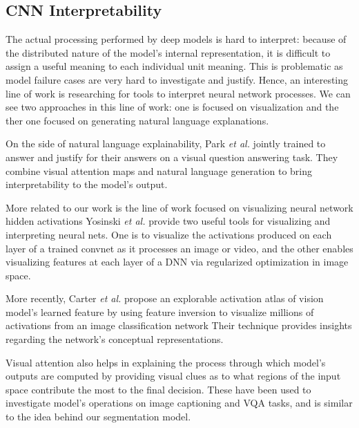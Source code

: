\documentclass[10pt,twocolumn,letterpaper]{article}
\begin{document}
\subsection{CNN Interpretability}
The actual processing performed by deep models is hard to interpret:
because of the distributed nature of the model's internal representation,
it is difficult to assign a useful meaning to each individual unit meaning.
This is problematic as model failure cases are very hard to investigate and justify.
Hence, an interesting line of work is researching for tools to interpret neural network processes.
We can see two approaches in this line of work:
one is focused on visualization and the ther one focused on generating natural language explanations.
 
On the side of natural language explainability, Park \textit{et al.} \cite{park2016attentive} jointly trained to answer and justify for their
answers on a visual question answering task. 
They combine visual attention maps and natural language generation to bring interpretability to the model's output.
 
More related to our work is the line of work focused on visualizing neural network hidden activations
Yosinski \textit{et al.} \cite{yosinski2015understanding} provide two useful tools for visualizing and interpreting neural nets. 
One is to visualize  the activations produced on each layer of a trained convnet as it 
processes an image or video, and the other enables visualizing 
features at each layer of a DNN via regularized optimization in image space.

More recently, Carter \textit{et al.} \cite{carter2019activation} propose an explorable activation atlas of vision model's learned feature by using feature inversion to visualize millions of activations from an image classification network
Their technique provides insights regarding the network's conceptual representations.

Visual attention \cite{allport1989visual} also helps in explaining the process through which model's 
outputs are computed by providing visual clues as to what regions of the input space 
contribute the most to the final decision. 
These have been used to investigate model's operations on image captioning \cite{you2016image} and VQA \cite{agrawal:2015}\cite{zhang2016yin}\cite{goyal2017making} tasks,
and is similar to the idea behind our segmentation model.
\end{document}
